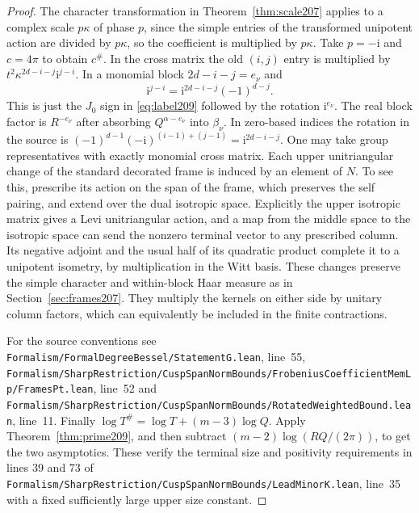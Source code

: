 \documentclass[a4paper,11pt]{article}
\theoremstyle{definition}
\theoremstyle{remark}
\newcommand{\srcloc}[2]{{\small\nolinkurl{#1.lean}}, line~#2}
\numberwithin{equation}{section}
\begin{document}
\begin{proof}
The character transformation in Theorem~\ref{thm:scale207}
applies to a complex scale \(p\kappa\) of phase \(p\), since the
simple entries of the transformed unipotent action are divided
by \(p\kappa\), so the coefficient is multiplied by \(p\kappa\).
Take \(p=-\mathrm i\) and \(c=4\pi\) to obtain \(c^\#\).
In the cross matrix the old \((i,j)\) entry is multiplied by
\(t^2\kappa^{2d-i-j}\mathrm i^{j-i}\).
In a monomial block \(2d-i-j=e_\nu\) and
\[
                  \mathrm i^{j-i}
                    =\mathrm i^{2d-i-j}(-1)^{d-j}.
\]
This is just the \(J_0\) sign in \eqref{eq:label209} followed by
the rotation \(\mathrm i^{e_\nu}\).
The real block factor is \(R^{-e_\nu}\) after absorbing
\(Q^{\alpha-e_\nu}\) into \(\beta_\nu\). In zero-based indices
the rotation in the source is
\((-1)^{d-1}(-\mathrm i)^{(i-1)+(j-1)}=\mathrm i^{2d-i-j}\).
One may take group representatives with exactly monomial cross
matrix. Each upper unitriangular change of the standard decorated
frame is induced by an element of \(N\). To see this, prescribe its action
on the span of the frame, which preserves the self pairing, and
extend over the dual isotropic space. Explicitly the upper
isotropic matrix gives a Levi unitriangular action, and a map
from the middle space to the isotropic space can send the
nonzero terminal vector to any prescribed column. Its negative
adjoint and the usual half of its quadratic product complete
it to a unipotent isometry, by multiplication in the Witt basis.
These changes preserve the simple character and within-block
Haar measure as in Section~\ref{sec:frames207}. They multiply
the kernels on either side by unitary column factors, which
can equivalently be included in the finite contractions.

For the source conventions see
\srcloc{Formalism/FormalDegreeBessel/StatementG}{55},
\srcloc{Formalism/SharpRestriction/CuspSpanNormBounds/FrobeniusCoefficientMemLp/FramesPt}{52}
and \srcloc{Formalism/SharpRestriction/CuspSpanNormBounds/RotatedWeightedBound}{11}.
Finally \(\log T^\#=\log T+(m-3)\log Q\). Apply
Theorem~\ref{thm:prime209}, and then subtract
\((m-2)\log(RQ/(2\pi))\), to get the two asymptotics. These
verify the terminal size and positivity requirements in lines
39 and 73 of
\srcloc{Formalism/SharpRestriction/CuspSpanNormBounds/LeadMinorK}{35}
with a fixed sufficiently large upper size constant.
\end{proof}
\end{document}
